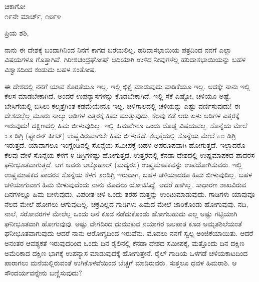 \begin{flushright}
ಚಿಕಾಗೋ\\೧೯ನೇ ಮಾರ್ಚ್, ೧೮೯೪
\end{flushright}

\noindent
ಪ್ರಿಯ ಶಶಿ,

ನಾನು ಈ ದೇಶಕ್ಕೆ ಬಂದಾಗಿನಿಂದ ನಿನಗೆ ಕಾಗದ ಬರೆಯಲಿಲ್ಲ. ಹರಿದಾಸಭಾಯಿಯ ಪತ್ರದಿಂದ ನನಗೆ ಎಲ್ಲಾ ವಿಷಯಗಳೂ ಗೊತ್ತಾಗಿವೆ. ಗಿರೀಶಚಂದ್ರಘೋಷ್ ಆದಿಯಾಗಿ ಉಳಿದ ನೀವುಗಳೆಲ್ಲ ಹರಿದಾಸಭಾಯಿಯನ್ನು ಬಹಳ ವಿಶ್ವಾಸದಿಂದ ಕಂಡುದು ಬಹಳ ಸಂತೋಷ.

ಈ ದೇಶದಲ್ಲಿ ನನಗೆ ಯಾವ ಕೊರತೆಯೂ ಇಲ್ಲ. ಇಲ್ಲಿ ಭಿಕ್ಷೆ ಮಾಡುವುದು ವಾಡಿಕೆಯೂ ಇಲ್ಲ. ಅದಕ್ಕೇ ನಾನು ಇಲ್ಲಿ ಕೆಲಸ ಮಾಡಬೇಕಾಗಿದೆ. ಅಂದರೆ ಉಪನ್ಯಾಸಗಳನ್ನು ಕೊಡಬೇಕಾಗಿದೆ. ಇಲ್ಲಿ ಸೆಕೆ ಎಷ್ಟೋ, ಚಳಿಯೂ ಅಷ್ಟೆ. ಬೇಸಿಗೆಯಲ್ಲಿ ಬಿಸಿಲು ಕಲ್ಕತ್ತೆಗಿಂತ ಕಡಮೆಯೇನೂ ಇಲ್ಲ. ಚಳಿಗಾಲದಲ್ಲಿ ಚಳಿಯನ್ನು ಎಷ್ಟು ವರ್ಣಿಸುವುದು! ಈ ದೇಶದಲ್ಲೆಲ್ಲ ಮೂರು ನಾಲ್ಕು ಅಡಿಗಳ ಎತ್ತರಕ್ಕೆ ಹಿಮ ಮುತ್ತುವುದು, ಕೆಲವು ಕಡೆ ಆರು ಏಳು ಅಡಿಗಳ ಎತ್ತರಕ್ಕೆ ಇರುವುದು! ದಕ್ಷಿಣದಲ್ಲಿ ಹಿಮ ಬೀಳುವುದಿಲ್ಲ. ಇಲ್ಲಿ ಹಿಮವೇನೂ ಒಂದು ದೊಡ್ಡ ವಿಷಯವಲ್ಲ. ಸೊನ್ನೆಯ ಮೇಲೆ ೩೨ ಡಿಗ್ರಿ (ಫ್ಯಾರನ್ ಹೀಟ್) ಉಷ್ಣವಿರುವಾಗಲೇ ಹಿಮ ಬೀಳುತ್ತದೆ. ಕಲ್ಕತ್ತೆಯಲ್ಲಿ ಸೊನ್ನೆಯ ಮೇಲೆ ೬೦ ಡಿಗ್ರಿ ಇರುತ್ತದೆ. ಯಾವಾಗಲೂ ಇಂಗ್ಲೆಂಡಿನಲ್ಲಿ ಸೊನ್ನೆಯ ಸಮೀಪಕ್ಕೆ ಬಹಳ ಅಪರೂಪವಾಗಿ ಹೋಗುತ್ತದೆ. ಇಲ್ಲಾದರೊ ಕೆಲವು ವೇಳೆ ಸೊನ್ನೆಯ ಕೆಳಗೆ ೪ ಡಿಗ್ರಿಗಳಷ್ಟು ಹೋಗುತ್ತದೆ. ಉತ್ತರದಲ್ಲಿ ಕೆನಡಾ ದೇಶದಲ್ಲಿ ಉಷ್ಣಮಾಪಕದ ಪಾದರಸ ಘನೀಭೂತವಾಗುತ್ತದೆ. ಆಗ ಅವರು ಆಲ್ಕೊಹಾಲ್ (ಮದ್ಯರಸ) ಉಷ್ಣಮಾಪಕವನ್ನು ಉಪಯೋಗಿಸುವರು. ಇಲ್ಲಿ ಉಷ್ಣಮಾಪಕದ ಪಾದರಸ ಸೊನ್ನೆಯ ಕೆಳಗೆ ೨೦ಡಿಗ್ರಿ ಇರುವಾಗ, ಬಹಳ ಚಳಿಯಾದರೂ ಹಿಮ ಬೀಳುವುದಿಲ್ಲ. ಬಹಳ ಚಳಿಯಾಗುವಾಗ ಹಿಮ ಬೀಳುವುದೆಂದು ನಾನು ಮೊದಲು ಯೋಚಿಸಿದ್ದೆ. ಆದರೆ ಹಾಗಿಲ್ಲ. ಸಾಧಾರಣ ಶಾಖವಿರುವ ದಿನಗಳಲ್ಲೂ ಹಿಮ ಬೀಳುವುದು. ವಿಪರೀತ ಚಳಿ ಒಂದು ತರಹ ಮತ್ತನ್ನು ಉಂಟುಮಾಡುವುದು. ಗಾಡಿಗಳು ಯಾವುವೂ ನೆಲದ ಮೇಲೆ ಹೋಗಲು ಆಗುವುದಿಲ್ಲ. ಚಕ್ರವಿಲ್ಲದ ಗಾಡಿಗಳು ಹಿಮದ ಮೇಲೆ ಜಾರಿಕೊಂಡು ಹೋಗುವುವು. ನದಿ, ನಾಲೆ, ಸರೋವರಗಳ ಮೇಲೆಲ್ಲ ಒಂದು ಆನೆ ಕೂಡ ನಡೆದುಕೊಂಡು ಹೋಗಬಹುದು \enginline{-} ಎಲ್ಲ ಅಷ್ಟು ಗಟ್ಟಿಯಾಗಿ ಘನೀಭೂತವಾಗಿ ಹೋಗುವುವು. ಅಷ್ಟು ವೇಗದಿಂದ ಧುಮುಕುವ ನಯಾಗರ ಜಲಪಾತ ಕೂಡ ಅಮೃತಶಿಲೆಯಂತೆ ಘನೀಭೂತವಾಗುವುದು ಆದರೆ ನಾನು ಆರೋಗ್ಯದಿಂದ ಇರುವೆನು. ಮೊದಲು ನನಗೆ ಸ್ವಲ್ಪ ಅಂಜಿಕೆಯಾಯಿತು. ಆದರೆ ಅನಂತರ ಆವಶ್ಯಕತೆ ಇರುವುದರಿಂದ ಒಂದು ದಿನ ರೈಲಿನಲ್ಲಿ ಕೆನಡಾ ದೇಶದ ಸಮೀಪಕ್ಕೆ, ಮತ್ತೊಂದು ದಿನ ದಕ್ಷಿಣ ಅಮೆರಿಕಾದ ದಕ್ಷಿಣ ಭಾಗಕ್ಕೆ ಉಪನ್ಯಾಸ ಮಾಡುವುದಕ್ಕೆ ಹೋಗುತ್ತೇನೆ. ರೈಲ್ ಗಾಡಿಯ ಒಳಗಡೆ ಚಳಿಯಕಾಟದಿಂದ ಪಾರಾಗಲು ಮನೆಯಲ್ಲಿರುವಂತೆ ಉಗಿಕೊಳವೆಯಿಂದ ಬೆಚ್ಚಗೆ ಮಾಡಿರುವರು. ಸುತ್ತಲೂ ಧವಳ ಹಿಮರಾಶಿ. ಆ ಸೌಂದರ್ಯವನ್ನೇನು ಬಣ್ಣಿಸುವುದು?

